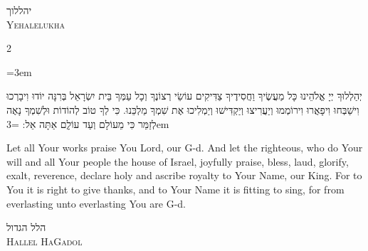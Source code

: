 \documentclass[11pt, openany]{book}
\newcommand{\sederdivider}{%
  \par\vspace{6pt}
  \begin{center}
    \textcolor{sedergold}{\pgfornament[width=1.5cm]{11}}
  \end{center}
  \par\vspace{6pt}
}
\newenvironment{bilingual}{%
  \par\vspace{4pt}%
  \begin{paracol}{2}%
}{%
  \end{paracol}%
  \par\vspace{2pt}%
}
\newenvironment{hebrewcol}{%
  \switchcolumn[1]%
  \begingroup
  \RTL
  \hebrewfont\large
  \setstretch{1.4}%
  \emergencystretch=3em
  \tolerance=9999
  \parindent=0pt\relax
}{%
  \endRTL
  \endgroup
}
\newenvironment{englishcol}{%
  \switchcolumn[0]%
  \begingroup
  \setstretch{1.4}%
  \emergencystretch=3em
  \tolerance=9999
  \normalsize
  \rightskip=0.12in\relax
}{%
  \endgroup
}
\newcommand{\subsedertitle}[2]{%
  \par\vspace{8pt}
  \begin{center}
    {\hebrewfontlarge\textcolor{sederblue}{\beginR #1\endR}}\\[3pt]
    {\normalsize\scshape\textcolor{sederblue}{#2}}
  \end{center}
  \par\vspace{3pt}
}
\begin{document}
\subsedertitle{יהללוך}{Yehalelukha}

\begin{bilingual}
\begin{hebrewcol}
יְהַלְלוּךָ יְיָ אֱלֹהֵינוּ כָּל מַעֲשֶׂיךָ וַחֲסִידֶיךָ צַדִּיקִים עוֹשֵׂי רְצוֹנֶךָ וְכָל עַמְּךָ בֵּית יִשְׂרָאֵל בְּרִנָּה יוֹדוּ וִיבָרְכוּ וִישַׁבְּחוּ וִיפָאֲרוּ וִירוֹמְמוּ וְיַעֲרִיצוּ וְיַקְדִּישׁוּ וְיַמְלִיכוּ אֶת שִׁמְךָ מַלְכֵּנוּ. כִּי לְךָ טוֹב לְהוֹדוֹת וּלְשִׁמְךָ נָאֶה לְזַמֵּר כִּי מֵעוֹלָם וְעַד עוֹלְָם אַתָּה אֵל:
\end{hebrewcol}
\begin{englishcol}
Let all Your works praise You Lord, our G-d. And let the righteous, who do Your will and all Your people the house of Israel, joyfully praise, bless, laud, glorify, exalt, reverence, declare holy and ascribe royalty to Your Name, our King. For to You it is right to give thanks, and to Your Name it is fitting to sing, for from everlasting unto everlasting You are G-d.
\end{englishcol}
\end{bilingual}
\sederdivider

\subsedertitle{הלל הגדול}{Hallel HaGadol}
\end{document}
